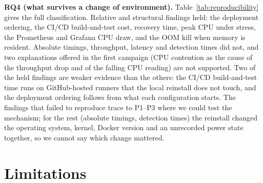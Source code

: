 \documentclass[conference]{IEEEtran}
\begin{document}
\textbf{RQ4 (what survives a change of environment).}
Table~\ref{tab:reproducibility} gives the full classification. Relative and
structural findings held: the deployment ordering, the CI/CD build-and-test cost,
recovery time, peak CPU under stress, the Prometheus and Grafana CPU draw, and the
OOM kill when memory is resident. Absolute timings, throughput, latency and detection
times did not, and two explanations offered in the first campaign (CPU contention as
the cause of the throughput drop and of the falling CPU reading) are not supported.
Two of the held findings are weaker evidence than the others: the CI/CD build-and-test
time runs on GitHub-hosted runners that the local reinstall does not touch, and the
deployment ordering follows from what each configuration starts. The findings that
failed to reproduce trace to P1--P3 where we could test the mechanism; for the rest
(absolute timings, detection times) the reinstall changed the operating system,
kernel, Docker version and an unrecorded power state together, so we cannot say which
change mattered.

\section{Limitations}
\label{sec:limitations}
\end{document}
